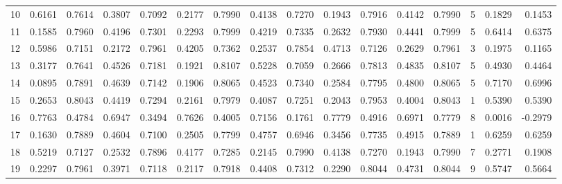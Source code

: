 \begin{tabular}{lrrrrrrrrrrrrrrr}
10 &      0.6161 &  0.7614 &  0.3807 &  0.7092 &  0.2177 &  0.7990 &  0.4138 &  0.7270 &  0.1943 &  0.7916 &   0.4142 &     0.7990 &      5 &                    0.1829 &                     0.1453 \\
11 &      0.1585 &  0.7960 &  0.4196 &  0.7301 &  0.2293 &  0.7999 &  0.4219 &  0.7335 &  0.2632 &  0.7930 &   0.4441 &     0.7999 &      5 &                    0.6414 &                     0.6375 \\
12 &      0.5986 &  0.7151 &  0.2172 &  0.7961 &  0.4205 &  0.7362 &  0.2537 &  0.7854 &  0.4713 &  0.7126 &   0.2629 &     0.7961 &      3 &                    0.1975 &                     0.1165 \\
13 &      0.3177 &  0.7641 &  0.4526 &  0.7181 &  0.1921 &  0.8107 &  0.5228 &  0.7059 &  0.2666 &  0.7813 &   0.4835 &     0.8107 &      5 &                    0.4930 &                     0.4464 \\
14 &      0.0895 &  0.7891 &  0.4639 &  0.7142 &  0.1906 &  0.8065 &  0.4523 &  0.7340 &  0.2584 &  0.7795 &   0.4800 &     0.8065 &      5 &                    0.7170 &                     0.6996 \\
15 &      0.2653 &  0.8043 &  0.4419 &  0.7294 &  0.2161 &  0.7979 &  0.4087 &  0.7251 &  0.2043 &  0.7953 &   0.4004 &     0.8043 &      1 &                    0.5390 &                     0.5390 \\
16 &      0.7763 &  0.4784 &  0.6947 &  0.3494 &  0.7626 &  0.4005 &  0.7156 &  0.1761 &  0.7779 &  0.4916 &   0.6971 &     0.7779 &      8 &                    0.0016 &                    -0.2979 \\
17 &      0.1630 &  0.7889 &  0.4604 &  0.7100 &  0.2505 &  0.7799 &  0.4757 &  0.6946 &  0.3456 &  0.7735 &   0.4915 &     0.7889 &      1 &                    0.6259 &                     0.6259 \\
18 &      0.5219 &  0.7127 &  0.2532 &  0.7896 &  0.4177 &  0.7285 &  0.2145 &  0.7990 &  0.4138 &  0.7270 &   0.1943 &     0.7990 &      7 &                    0.2771 &                     0.1908 \\
19 &      0.2297 &  0.7961 &  0.3971 &  0.7118 &  0.2117 &  0.7918 &  0.4408 &  0.7312 &  0.2290 &  0.8044 &   0.4731 &     0.8044 &      9 &                    0.5747 &                     0.5664 \\
\bottomrule
\end{tabular}
